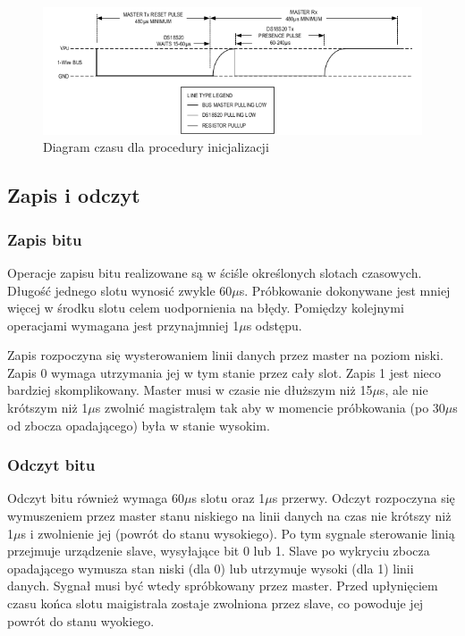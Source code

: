 \documentclass[a4paper]{article}
\begin{document}
\begin{figure}[!h]
\begin{center}
\includegraphics[scale=0.4]{graphics/init.png}
\end{center}
\label{inititming}
\caption{Diagram czasu dla procedury inicjalizacji}
\end{figure}

\subsection{Zapis i odczyt}
\subsubsection{Zapis bitu}
Operacje zapisu bitu realizowane są w ściśle określonych slotach czasowych. Długość jednego slotu wynosić zwykle 60$\mu$s. Próbkowanie dokonywane jest mniej więcej w środku slotu celem uodpornienia na błędy. Pomiędzy kolejnymi operacjami wymagana jest przynajmniej 1$\mu$s odstępu.

Zapis rozpoczyna się wysterowaniem linii danych przez master na poziom niski. Zapis 0 wymaga utrzymania jej w tym stanie przez cały slot. Zapis 1 jest nieco bardziej skomplikowany. Master musi w czasie nie dłuższym niż 15$\mu$s, ale nie krótszym niż 1$\mu$s zwolnić magistralęm tak aby w momencie próbkowania (po 30$\mu$s od zbocza opadającego) była w stanie wysokim. 

\subsubsection{Odczyt bitu}
Odczyt bitu również wymaga 60$\mu$s slotu oraz 1$\mu$s przerwy. Odczyt rozpoczyna się wymuszeniem przez master stanu niskiego na linii danych na czas nie krótszy niż 1$\mu$s i zwolnienie jej (powrót do stanu wysokiego). Po tym sygnale sterowanie linią przejmuje urządzenie slave, wysyłające bit 0 lub 1. Slave po wykryciu zbocza opadającego wymusza stan niski (dla 0) lub utrzymuje  wysoki (dla 1) linii danych. Sygnał musi być wtedy spróbkowany przez master. Przed upłynięciem czasu końca slotu maigistrala zostaje zwolniona przez slave, co powoduje jej powrót do stanu wyokiego.
\end{document}
